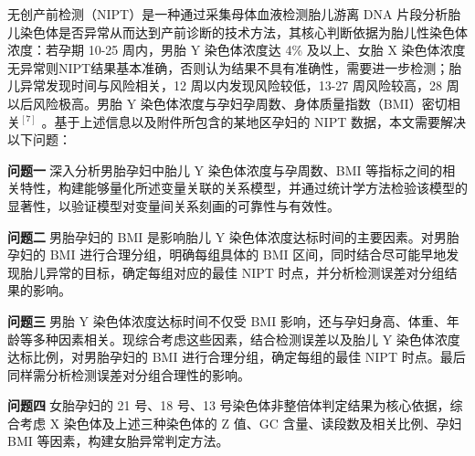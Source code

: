 无创产前检测（NIPT）是一种通过采集母体血液检测胎儿游离 DNA 片段分析胎儿染色体是否异常从而达到产前诊断的技术方法，其核心判断依据为胎儿性染色体浓度：若孕期 10-25 周内，男胎 Y 染色体浓度达 4\% 及以上、女胎 X 染色体浓度无异常则NIPT结果基本准确，否则认为结果不具有准确性，需要进一步检测；胎儿异常发现时间与风险相关，12 周以内发现风险较低，13-27 周风险较高，28 周以后风险极高。男胎 Y 染色体浓度与孕妇孕周数、身体质量指数（BMI）密切相关$^{[7]}$ 。基于上述信息以及附件所包含的某地区孕妇的 NIPT 数据，本文需要解决以下问题：

\textbf{问题一}$\;$深入分析男胎孕妇中胎儿 Y 染色体浓度与孕周数、BMI 等指标之间的相关特性，构建能够量化所述变量关联的关系模型，并通过统计学方法检验该模型的显著性，以验证模型对变量间关系刻画的可靠性与有效性。

\textbf{问题二}$\;$男胎孕妇的 BMI 是影响胎儿 Y 染色体浓度达标时间的主要因素。对男胎孕妇的 BMI 进行合理分组，明确每组具体的 BMI 区间，同时结合尽可能早地发现胎儿异常的目标，确定每组对应的最佳 NIPT 时点，并分析检测误差对分组结果的影响。

\textbf{问题三}$\;$男胎 Y 染色体浓度达标时间不仅受 BMI 影响，还与孕妇身高、体重、年龄等多种因素相关。现综合考虑这些因素，结合检测误差以及胎儿 Y 染色体浓度达标比例，对男胎孕妇的 BMI 进行合理分组，确定每组的最佳 NIPT 时点。最后同样需分析检测误差对分组合理性的影响。

\textbf{问题四}$\;$女胎孕妇的 21 号、18 号、13 号染色体非整倍体判定结果为核心依据，综合考虑 X 染色体及上述三种染色体的 Z 值、GC 含量、读段数及相关比例、孕妇 BMI 等因素，构建女胎异常判定方法。 
